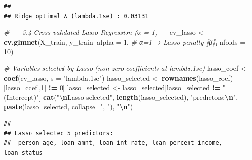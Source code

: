 \documentclass[
]{article}
\newenvironment{Shaded}{\begin{snugshade}}{\end{snugshade}}
\newcommand{\AttributeTok}[1]{\textcolor[rgb]{0.13,0.29,0.53}{#1}}
\newcommand{\CommentTok}[1]{\textcolor[rgb]{0.56,0.35,0.01}{\textit{#1}}}
\newcommand{\DecValTok}[1]{\textcolor[rgb]{0.00,0.00,0.81}{#1}}
\newcommand{\FunctionTok}[1]{\textcolor[rgb]{0.13,0.29,0.53}{\textbf{#1}}}
\newcommand{\NormalTok}[1]{#1}
\newcommand{\OtherTok}[1]{\textcolor[rgb]{0.56,0.35,0.01}{#1}}
\newcommand{\SpecialCharTok}[1]{\textcolor[rgb]{0.81,0.36,0.00}{\textbf{#1}}}
\newcommand{\StringTok}[1]{\textcolor[rgb]{0.31,0.60,0.02}{#1}}
\begin{document}
\begin{verbatim}
## 
## Ridge optimal λ (lambda.1se) : 0.03131
\end{verbatim}

\begin{Shaded}
\begin{Highlighting}[]
\CommentTok{\# {-}{-}{-} 5.4  Cross{-}validated Lasso Regression (α = 1) {-}{-}{-}}
\NormalTok{cv\_lasso }\OtherTok{\textless{}{-}} \FunctionTok{cv.glmnet}\NormalTok{(X\_train, y\_train,}
                       \AttributeTok{alpha  =} \DecValTok{1}\NormalTok{,      }\CommentTok{\# α=1 → Lasso penalty ‖β‖₁}
                       \AttributeTok{nfolds =} \DecValTok{10}\NormalTok{)}

\CommentTok{\# Variables selected by Lasso (non{-}zero coefficients at lambda.1se)}
\NormalTok{lasso\_coef }\OtherTok{\textless{}{-}} \FunctionTok{coef}\NormalTok{(cv\_lasso, }\AttributeTok{s =} \StringTok{"lambda.1se"}\NormalTok{)}
\NormalTok{lasso\_selected }\OtherTok{\textless{}{-}} \FunctionTok{rownames}\NormalTok{(lasso\_coef)[lasso\_coef[,}\DecValTok{1}\NormalTok{] }\SpecialCharTok{!=} \DecValTok{0}\NormalTok{]}
\NormalTok{lasso\_selected }\OtherTok{\textless{}{-}}\NormalTok{ lasso\_selected[lasso\_selected }\SpecialCharTok{!=} \StringTok{"(Intercept)"}\NormalTok{]}
\FunctionTok{cat}\NormalTok{(}\StringTok{"}\SpecialCharTok{\textbackslash{}n}\StringTok{Lasso selected"}\NormalTok{, }\FunctionTok{length}\NormalTok{(lasso\_selected), }\StringTok{"predictors:}\SpecialCharTok{\textbackslash{}n}\StringTok{"}\NormalTok{,}
    \FunctionTok{paste}\NormalTok{(lasso\_selected, }\AttributeTok{collapse=}\StringTok{", "}\NormalTok{), }\StringTok{"}\SpecialCharTok{\textbackslash{}n}\StringTok{"}\NormalTok{)}
\end{Highlighting}
\end{Shaded}

\begin{verbatim}
## 
## Lasso selected 5 predictors:
##  person_age, loan_amnt, loan_int_rate, loan_percent_income, loan_status
\end{verbatim}
\end{document}
